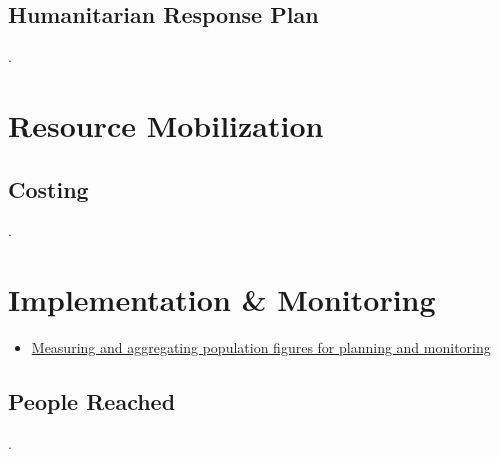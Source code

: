 \documentclass[
  a4paper,
  onecolumn,
  oneside]{book}
\providecommand{\tightlist}{%
  \setlength{\itemsep}{0pt}\setlength{\parskip}{0pt}}\usepackage{longtable,booktabs,array}
\begin{document}
\hypertarget{humanitarian-response-plan}{%
\section{Humanitarian Response Plan}\label{humanitarian-response-plan}}

.

\hypertarget{resource-mobilization}{%
\chapter{Resource Mobilization}\label{resource-mobilization}}

\hypertarget{costing}{%
\section{Costing}\label{costing}}

.

\hypertarget{implementation-monitoring}{%
\chapter{Implementation \& Monitoring}\label{implementation-monitoring}}

\begin{tcolorbox}[enhanced jigsaw, leftrule=.75mm, arc=.35mm, breakable, toprule=.15mm, opacitybacktitle=0.6, title=\textcolor{quarto-callout-tip-color}{\faLightbulb}\hspace{0.5em}{Recommended reading}, toptitle=1mm, colframe=quarto-callout-tip-color-frame, left=2mm, opacityback=0, rightrule=.15mm, colback=white, coltitle=black, bottomrule=.15mm, colbacktitle=quarto-callout-tip-color!10!white, bottomtitle=1mm, titlerule=0mm]

\begin{itemize}
\tightlist
\item
  \href{files/OCHA\%20Approaches\%20to\%20determining\%20people\%20reached\%202022.pdf}{Measuring
  and aggregating population figures for planning and monitoring}
\end{itemize}

\end{tcolorbox}

\hypertarget{people-reached}{%
\section{People Reached}\label{people-reached}}

.
\end{document}
